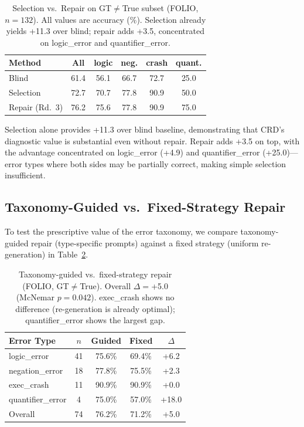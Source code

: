 \documentclass[11pt,a4paper]{article}
\newcommand{\pp}{\text{pp}}
\begin{document}
\begin{table}[t]
\centering
\small
\setlength{\tabcolsep}{4pt}
\begin{tabular}{lccccc}
\toprule
\textbf{Method} & \textbf{All} & \textbf{logic} & \textbf{neg.} & \textbf{crash} & \textbf{quant.} \\
\midrule
Blind & 61.4 & 56.1 & 66.7 & 72.7 & 25.0 \\
Selection & 72.7 & 70.7 & 77.8 & 90.9 & 50.0 \\
Repair (Rd.~3) & 76.2 & 75.6 & 77.8 & 90.9 & 75.0 \\
\bottomrule
\end{tabular}
\caption{Selection vs.\ Repair on GT$\neq$True subset (FOLIO, $n\!=\!132$). All values are accuracy (\%). Selection already yields +11.3\pp{} over blind; repair adds +3.5\pp{}, concentrated on logic\_error and quantifier\_error.}
\label{tab:selection_repair}
\end{table}

Selection alone provides +11.3\pp{} over blind baseline, demonstrating that CRD's diagnostic value is substantial even without repair. Repair adds +3.5\pp{} on top, with the advantage concentrated on logic\_error (+4.9\pp{}) and quantifier\_error (+25.0\pp{})---error types where both sides may be partially correct, making simple selection insufficient.

\subsection{Taxonomy-Guided vs.\ Fixed-Strategy Repair}
\label{sec:taxonomy_ablation}

To test the prescriptive value of the error taxonomy, we compare taxonomy-guided repair (type-specific prompts) against a fixed strategy (uniform re-generation) in Table~\ref{tab:taxonomy_ablation}.

\begin{table}[t]
\centering
\small
\begin{tabular}{lcccc}
\toprule
\textbf{Error Type} & $n$ & \textbf{Guided} & \textbf{Fixed} & $\Delta$ \\
\midrule
logic\_error & 41 & 75.6\% & 69.4\% & +6.2\pp{} \\
negation\_error & 18 & 77.8\% & 75.5\% & +2.3\pp{} \\
exec\_crash & 11 & 90.9\% & 90.9\% & +0.0\pp{} \\
quantifier\_error & 4 & 75.0\% & 57.0\% & +18.0\pp{} \\
\midrule
Overall & 74 & 76.2\% & 71.2\% & +5.0\pp{} \\
\bottomrule
\end{tabular}
\caption{Taxonomy-guided vs.\ fixed-strategy repair (FOLIO, GT$\neq$True). Overall $\Delta\!=\!$+5.0\pp{} (McNemar $p\!=\!0.042$). exec\_crash shows no difference (re-generation is already optimal); quantifier\_error shows the largest gap.}
\label{tab:taxonomy_ablation}
\end{table}
\end{document}
